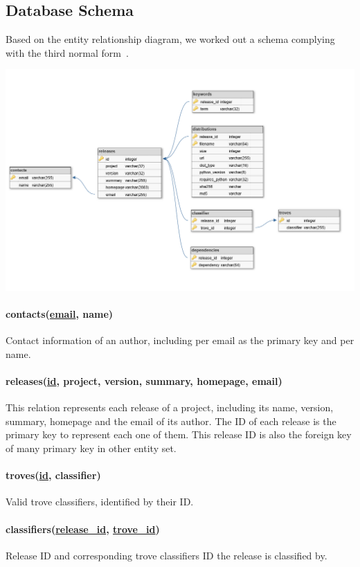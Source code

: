 \documentclass[a4paper,12pt]{article}
\newcommand{\id}[1]{\underline{#1\_id}}
\begin{document}
\subsection{Database Schema}
Based on the entity relationship diagram, we worked out a schema complying
with the third normal form~\cite{3nf}.
\begin{center}
  \includegraphics[width=\textwidth]{schema.png}
\end{center}

\paragraph{contacts(\underline{email}, name)} Contact information of an author,
including per email as the primary key and per name.

\paragraph{releases(\underline{id}, project, version, summary, homepage, email)}
This relation represents each release of a project, including its name, version,
summary, homepage and the email of its author.  The ID of each release is
the primary key to represent each one of them.  This release ID is also
the foreign key of many primary key in other entity set.

\paragraph{troves(\underline{id}, classifier)} Valid trove classifiers,
identified by their ID.

\paragraph{classifiers(\id{release}, \id{trove})}
Release ID and corresponding trove classifiers ID the release is classified by.
\end{document}
